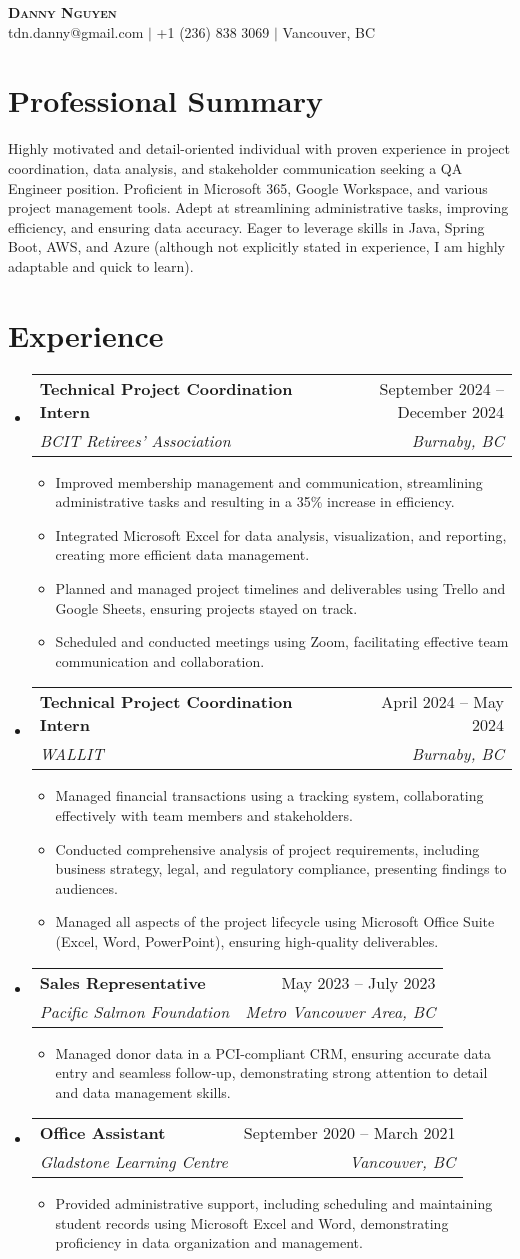 \documentclass[letterpaper,11pt]{article}
\makeatletter
\newcommand{\resumeItem}[1]{
\item\small{
{#1 \vspace{-2pt}}
}
}
\newcommand{\resumeSubheading}[4]{
\vspace{-2pt}\item
\begin{tabular*}{0.97\textwidth}[t]{l@{\extracolsep{\fill}}r}
\textbf{#1} & #2 \\
\textit{\small#3} & \textit{\small #4} \\
\end{tabular*}\vspace{-7pt}
}
\newcommand{\resumeSubHeadingListStart}{\begin{itemize}[leftmargin=0.15in, label={}]}
\newcommand{\resumeSubHeadingListEnd}{\end{itemize}}
\newcommand{\resumeItemListStart}{\begin{itemize}}
\newcommand{\resumeItemListEnd}{\end{itemize}\vspace{-5pt}}
\makeatother
\begin{document}
\begin{center}
\textbf{\Huge \scshape Danny Nguyen} \\ \vspace{1pt}
\small tdn.danny@gmail.com $|$ +1 (236) 838 3069 $|$ Vancouver, BC
\end{center}

\section{Professional Summary}
Highly motivated and detail-oriented individual with proven experience in project coordination, data analysis, and stakeholder communication seeking a QA Engineer position.  Proficient in Microsoft 365, Google Workspace, and various project management tools.  Adept at streamlining administrative tasks, improving efficiency, and ensuring data accuracy.  Eager to leverage skills in Java, Spring Boot, AWS, and Azure (although not explicitly stated in experience, I am highly adaptable and quick to learn).

\section{Experience}
\resumeSubHeadingListStart
\resumeSubheading{Technical Project Coordination Intern}{September 2024 – December 2024}{BCIT Retirees' Association}{Burnaby, BC}
\resumeItemListStart
\resumeItem{Improved membership management and communication, streamlining administrative tasks and resulting in a 35\% increase in efficiency.}
\resumeItem{Integrated Microsoft Excel for data analysis, visualization, and reporting, creating more efficient data management.}
\resumeItem{Planned and managed project timelines and deliverables using Trello and Google Sheets, ensuring projects stayed on track.}
\resumeItem{Scheduled and conducted meetings using Zoom, facilitating effective team communication and collaboration.}
\resumeItemListEnd
\resumeSubheading{Technical Project Coordination Intern}{April 2024 – May 2024}{WALLIT}{Burnaby, BC}
\resumeItemListStart
\resumeItem{Managed financial transactions using a tracking system, collaborating effectively with team members and stakeholders.}
\resumeItem{Conducted comprehensive analysis of project requirements, including business strategy, legal, and regulatory compliance, presenting findings to audiences.}
\resumeItem{Managed all aspects of the project lifecycle using Microsoft Office Suite (Excel, Word, PowerPoint), ensuring high-quality deliverables.}
\resumeItemListEnd
\resumeSubheading{Sales Representative}{May 2023 – July 2023}{Pacific Salmon Foundation}{Metro Vancouver Area, BC}
\resumeItemListStart
\resumeItem{Managed donor data in a PCI-compliant CRM, ensuring accurate data entry and seamless follow-up, demonstrating strong attention to detail and data management skills.}
\resumeItemListEnd
\resumeSubheading{Office Assistant}{September 2020 – March 2021}{Gladstone Learning Centre}{Vancouver, BC}
\resumeItemListStart
\resumeItem{Provided administrative support, including scheduling and maintaining student records using Microsoft Excel and Word, demonstrating proficiency in data organization and management.}
\resumeItemListEnd
\resumeSubHeadingListEnd
\end{document}
